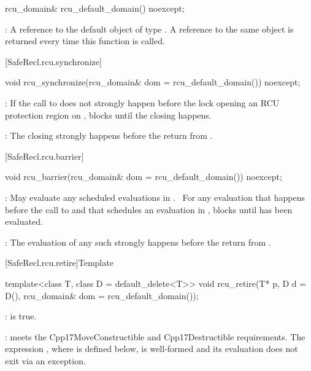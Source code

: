 \begin{codeblock}
rcu_domain& rcu_default_domain() noexcept;
\end{codeblock}

\pnum
{}: A reference to the default object of type .
A reference to the same object is returned every time this
function is called.

[SafeRecl.rcu.synchronize]{}

\begin{codeblock}
void rcu_synchronize(rcu_domain& dom = rcu_default_domain()) noexcept;
\end{codeblock}

\pnum
{}: If the call to  does not strongly
happen before the lock opening an RCU protection region 
on , blocks until the  closing 
happens.

\pnum
{}: The  closing  strongly
happens before the return from .

[SafeRecl.rcu.barrier]{}

\begin{codeblock}
void rcu_barrier(rcu_domain& dom = rcu_default_domain()) noexcept;
\end{codeblock}

\pnum
{}: May evaluate any scheduled evaluations in
.  For any evaluation that happens before the call
to  and that schedules an evaluation 
in , blocks until  has been evaluated.  

\pnum
{}: The evaluation of any such  strongly
happens before the return from .

[SafeRecl.rcu.retire]{Template }

\begin{codeblock}
template<class T, class D = default_delete<T>>
void rcu_retire(T* p, D d = D(), rcu_domain& dom = rcu_default_domain());
\end{codeblock}

\pnum
{}:  is true.

\pnum
{}:  meets the Cpp17MoveConstructible and
Cpp17Destructible requirements.
The expression , where  is defined below, is
well-formed and its evaluation does not exit via an exception.

